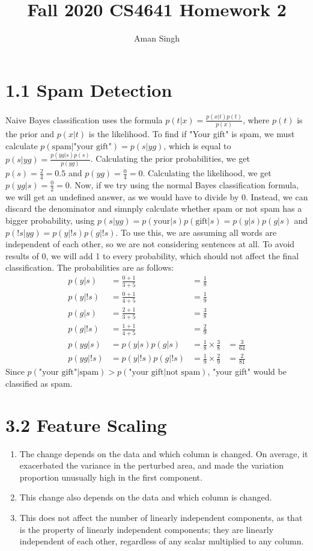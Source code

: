 \documentclass{article}
\title{Fall 2020 CS4641 Homework 2}
\author{Aman Singh}
\begin{document}
\maketitle

\section*{1.1 Spam Detection}
Naive Bayes classification uses the formula $p(t|x)=\frac{p(x|t)p(t)}{p(x)}$, where $p(t)$ is the prior
and $p(x|t)$ is the likelihood. To find if "Your gift" is spam, we must calculate
$p(\text{spam}|\text{"your gift"}) = p(s|yg)$, which is equal to $p(s|yg)=\frac{p(yg|s)p(s)}{p(yg)}$.
Calculating the prior probabilities, we get $p(s)=\frac{2}{4}=0.5$ and $p(yg)=\frac{0}{4}=0$. Calculating the likelihood, we
get $p(yg|s)=\frac{0}{2}=0$. Now, if we try using the normal Bayes classification formula, we will get 
an undefined answer, as we would have to divide by 0. Instead, we can discard the denominator and
simnply calculate whether spam or not spam has a bigger probability, using
$p(s|yg)=p(\text{your}|s)p(\text{gift}|s)=p(y|s)p(g|s)$ and $p(!s|yg)=p(y|!s)p(g|!s)$.
To use this, we are assuming all words are independent of each other, so we are not considering sentences
at all. To avoid results of 0, we will add 1 to every probability, which should not affect the final
classification. The probabilities are as follows: \begin{align*}
    p(y|s) &= \frac{0+1}{3+5} &= \frac{1}{8} \\
    p(y|!s) &= \frac{0+1}{4+5} &= \frac{1}{9} \\
    p(g|s) &= \frac{2+1}{3+5} &= \frac{3}{8} \\
    p(g|!s) &= \frac{1+1}{4+5} &= \frac{2}{9} \\
    p(yg|s) &= p(y|s)p(g|s) &= \frac{1}{8}\times\frac{3}{8} &= \frac{3}{64} \\
    p(yg|!s) &= p(y|!s)p(g|!s) &= \frac{1}{9}\times\frac{2}{9} &= \frac{2}{81}
\end{align*}
Since $p(\text{"your gift"}|\text{spam})>p(\text{"your gift}|\text{not spam})$, "your gift" would be 
classified as spam.

\section*{3.2 Feature Scaling}
\begin{enumerate}
    \item The change depends on the data and which column is changed. On average, it exacerbated the
            variance in the perturbed area, and made the variation proportion unusually high in the first component.
    \item This change also depends on the data and which column is changed.
    \item This does not affect the number of linearly independent components, as that is the property of
            linearly independent components; they are linearly independent of each other, regardless of any scalar
            multiplied to any column.
\end{enumerate}
\end{document}
